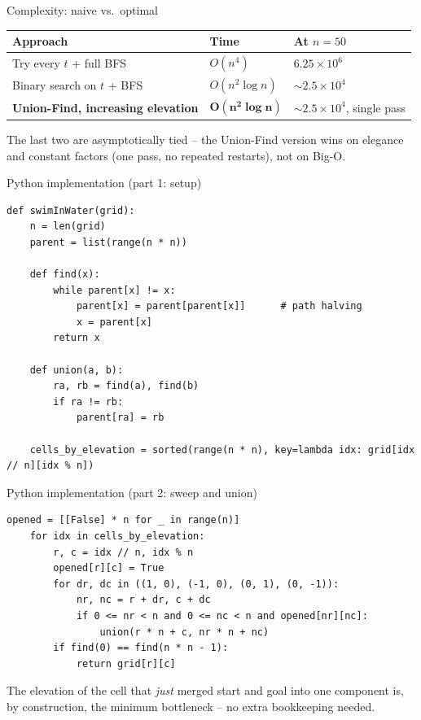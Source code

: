 \documentclass[11pt,aspectratio=169]{beamer}
\begin{document}
\begin{frame}{Complexity: naive vs.\ optimal}
  \begin{center}
  \begin{tabular}{@{}lll@{}}
    \toprule
    Approach & Time & At $n=50$ \\
    \midrule
    Try every $t$ + full BFS & $O(n^4)$ & $6.25\times 10^6$ \\
    Binary search on $t$ + BFS & $O(n^2\log n)$ & $\sim 2.5\times 10^4$ \\
    \textbf{Union-Find, increasing elevation} & $\boldsymbol{O(n^2\log n)}$ &
    $\sim 2.5\times 10^4$, single pass \\
    \bottomrule
  \end{tabular}
  \end{center}
  The last two are asymptotically tied -- the Union-Find version wins on
  elegance and constant factors (one pass, no repeated restarts), not on
  Big-O.
\end{frame}

\begin{frame}[fragile]{Python implementation (part 1: setup)}
  \begin{lstlisting}[style=py,aboveskip=0pt,belowskip=0pt]
def swimInWater(grid):
    n = len(grid)
    parent = list(range(n * n))

    def find(x):
        while parent[x] != x:
            parent[x] = parent[parent[x]]      # path halving
            x = parent[x]
        return x

    def union(a, b):
        ra, rb = find(a), find(b)
        if ra != rb:
            parent[ra] = rb

    cells_by_elevation = sorted(range(n * n), key=lambda idx: grid[idx // n][idx % n])
  \end{lstlisting}
\end{frame}

\begin{frame}[fragile]{Python implementation (part 2: sweep and union)}
  \begin{lstlisting}[style=py,aboveskip=0pt,belowskip=0pt]
    opened = [[False] * n for _ in range(n)]
    for idx in cells_by_elevation:
        r, c = idx // n, idx % n
        opened[r][c] = True
        for dr, dc in ((1, 0), (-1, 0), (0, 1), (0, -1)):
            nr, nc = r + dr, c + dc
            if 0 <= nr < n and 0 <= nc < n and opened[nr][nc]:
                union(r * n + c, nr * n + nc)
        if find(0) == find(n * n - 1):
            return grid[r][c]
  \end{lstlisting}
  The elevation of the cell that \emph{just} merged start and goal into one
  component is, by construction, the minimum bottleneck -- no extra bookkeeping
  needed.
\end{frame}
\end{document}
